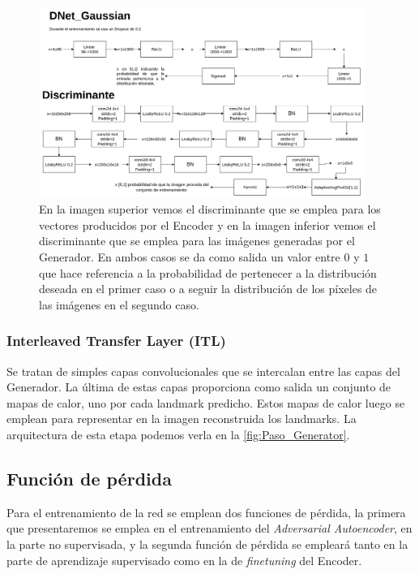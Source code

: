             \begin{figure}[!h]
                \centering
                \includegraphics[width=0.95\textwidth]{img/DGaussian.png}
                \caption{En la imagen superior vemos el discriminante que se emplea para los vectores producidos por el Encoder y en la imagen inferior vemos el discriminante que se emplea para las imágenes generadas por el Generador. En ambos casos se da como salida un valor entre $0$ y $1$ que hace referencia a la probabilidad de pertenecer a la distribución deseada en el primer caso o a seguir la distribución de los píxeles de las imágenes en el segundo caso.}
                \label{fig:DGaussian}
            \end{figure}

            \subsubsection{Interleaved Transfer Layer (ITL)}
                
                \noindent Se tratan de simples capas convolucionales que se intercalan entre las capas del Generador. La última de estas capas proporciona como salida un conjunto de mapas de calor, uno por cada landmark predicho. Estos mapas de calor luego se emplean para representar en la imagen reconstruida los landmarks. La arquitectura de esta etapa podemos verla en la \autoref{fig:Paso_Generator}.
            
        \subsection{Función de pérdida}

            \noindent Para el entrenamiento de la red se emplean dos funciones de pérdida, la primera que presentaremos se emplea en el entrenamiento del \textit{Adversarial Autoencoder}, en la parte no supervisada, y la segunda función de pérdida se empleará tanto en la parte de aprendizaje supervisado como en la de \textit{finetuning} del Encoder.

